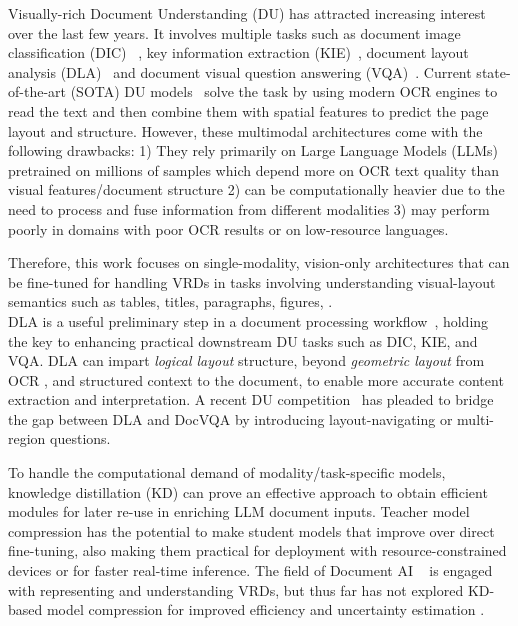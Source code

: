 \documentclass[runningheads]{llncs}
\begin{document}
Visually-rich Document Understanding (DU) has attracted increasing interest over the last few years.
It involves multiple tasks such as document image classification (DIC) ~\cite{kang2014convolutional, harley2015evaluation, jain2019multimodal, liu2021document}, key information extraction (KIE)~\cite{liao2023doctr,luo2023geolayoutlm, simsa2023docile, jaume2019funsd, stanislawek2021kleister}, document layout analysis (DLA)~\cite{binmakhashen2019document, pfitzmann2022doclaynet, da2023vision, zhong2019publaynet, biswas2021beyond} and document visual question answering (VQA)~\cite{mathew2021docvqa, ding2022v, mathew2022infographicvqa, tito2021icdar}.
Current state-of-the-art (SOTA) DU models~\cite{huang2022layoutlmv3,gu2021unidoc} solve the task by using modern OCR engines to read the text and then combine them with spatial features to predict the page layout and structure. However, these multimodal architectures come with the following drawbacks: 1) They rely primarily on Large Language Models (LLMs) \cite{zhao2023survey} %
pretrained on millions of samples which depend more on OCR text quality than visual features/document structure 2) can be computationally heavier due to the need to process and fuse information from different modalities 3) may perform poorly in domains with poor OCR results or on low-resource languages.

Therefore, this work focuses on single-modality, vision-only architectures that can be fine-tuned for handling VRDs in tasks involving understanding visual-layout semantics such as tables, titles, paragraphs, figures, \etc. \\
DLA is a useful preliminary step in a document processing workflow~\cite{binmakhashen2019document, da2023vision}, holding the key to enhancing practical downstream DU tasks such as DIC, KIE, and VQA. DLA can impart \textit{logical layout} structure, beyond \textit{geometric layout} from OCR \cite{haralick1994document}, and structured context to the document, to enable more accurate content extraction and interpretation. A recent DU competition~\cite{VanLandeghem2023icdar} has pleaded to bridge the gap between DLA and DocVQA by introducing layout-navigating or multi-region questions.

To handle the computational demand of modality/task-specific models, knowledge distillation (KD) \cite{ba2014deep,hinton2015distilling,romero2014fitnets,gou2021knowledge} can prove an effective approach to obtain efficient modules for later re-use in enriching LLM document inputs. Teacher model compression has the potential to make student models that improve over direct fine-tuning, also making them practical for deployment with resource-constrained devices or for faster real-time inference.
The field of Document AI ~\cite{cui2021document} is engaged with representing and understanding VRDs, but thus far has not explored KD-based model compression for improved efficiency and uncertainty estimation \cite{galil2023can}.
\end{document}
